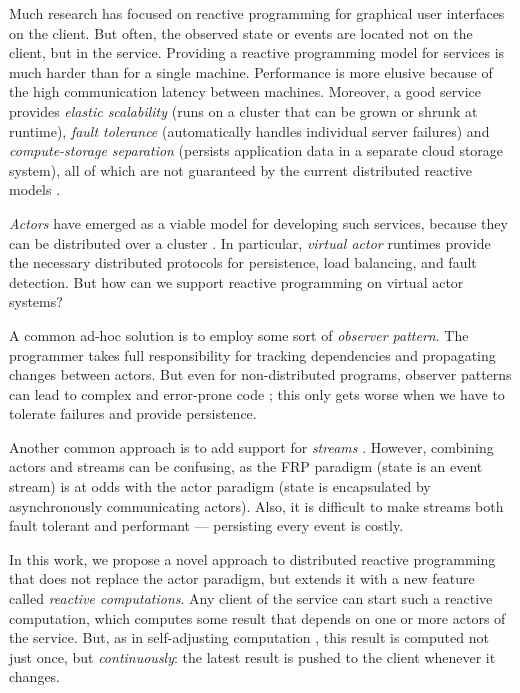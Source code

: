  Much research has focused on reactive programming for graphical user interfaces \cite{elm,flapjax,alive} on the client. But often, the observed state or events are located not on the client, but in the service. Providing a reactive programming model for services is much harder than for a single machine. Performance is more elusive because of the high communication latency between machines. Moreover, a good service provides \emph{elastic scalability} (runs on a cluster that can be grown or shrunk at runtime),  \emph{fault tolerance} (automatically handles individual server failures) and \emph{compute-storage separation} (persists application data in a separate cloud storage system), 
all of which are not guaranteed by the current distributed reactive models \cite{drescala}.

\emph{Actors} have emerged as a viable model for developing such services, because they can be distributed over a cluster \cite{erlang,akka,orleans}. In particular, \emph{virtual actor} runtimes \cite{orleanstr,orleans,sfactors,orbit} provide the necessary distributed protocols for persistence, load balancing, and fault detection. But how can we support reactive programming on virtual actor systems?
 
A common ad-hoc solution is to employ some sort of \emph{observer pattern}. The programmer takes full responsibility for tracking dependencies and propagating changes between actors. But even for non-distributed programs, observer patterns can lead to complex and error-prone code \cite{sobserver}; this only gets worse when we have to tolerate failures and provide persistence. 

Another common approach is to add support for \emph{streams} \cite{orleans,reactors-io}. However, combining actors and streams can be confusing, as the FRP paradigm (state is an event stream) is at odds with the actor paradigm (state is encapsulated by asynchronously communicating actors). Also, it is difficult to make streams both fault tolerant and performant --- persisting every event is costly. 

 In this work, we propose a novel approach to distributed reactive programming that does not replace the actor paradigm, but extends it with a new feature called \emph{reactive computations}. Any client of the service can start such a reactive computation, which computes some result that depends on one or more actors of the service. But, as in self-adjusting computation \cite{Acar:SelfAdjustingOverview}, this result is computed not just once, but \emph{continuously}: the latest result is pushed to the client whenever it changes. 

